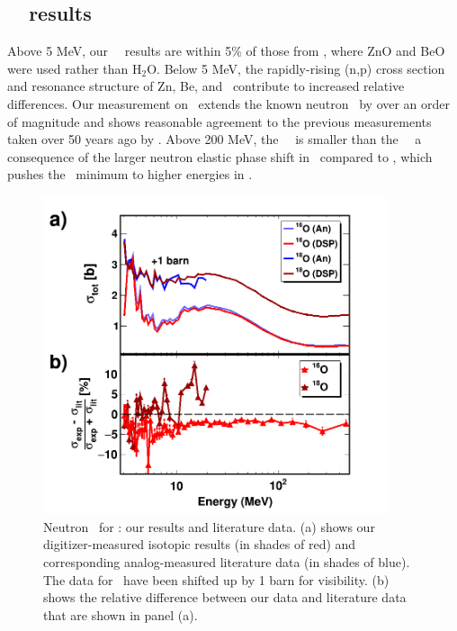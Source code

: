 \subsection{\oSixEight\ \tot\ results}
Above 5 MeV, our \oSix\ \tot\ results are within 5\% of those from \cite{Finlay1993}, where
ZnO and BeO were used rather than H$_{2}$O. Below 5 MeV, the rapidly-rising
(n,p) cross section and resonance structure of Zn, Be, and \oSix\ contribute to
increased relative differences. Our measurement on \oEight\ extends the known
neutron \tot\ by over an order of magnitude and shows reasonable agreement to
the previous measurements taken over 50 years ago by \cite{Vaughn1965,Salisbury1965}.
Above 200 MeV, the \oEight\ \tot\ is smaller than the \oSix\ \tot\, a
consequence of the larger neutron elastic phase shift in \oEight\ compared to
\oSix, which pushes the \tot\ minimum to higher energies in \oEight.
\begin{figure}[ht!]
    \centering
    \includegraphics[width=0.9\textwidth]{figures/TwoPanelO.png}
    \caption[Neutron \tot\ for \oSixEight: our results and literature data]
    {Neutron \tot\ for \oSixEight: our results and literature data.
        (a) shows our digitizer-measured isotopic results (in shades of red) and
        corresponding analog-measured literature data \cite{Finlay1993, Perey1972, Vaughn1965,
        Salisbury1965} (in shades of blue). The data for \oEight\ have been
        shifted up by 1 barn for visibility.
        (b) shows the relative difference between our data
        and literature data that are shown in panel (a).
    }
    \label{TwoPanelO}
\end{figure}
